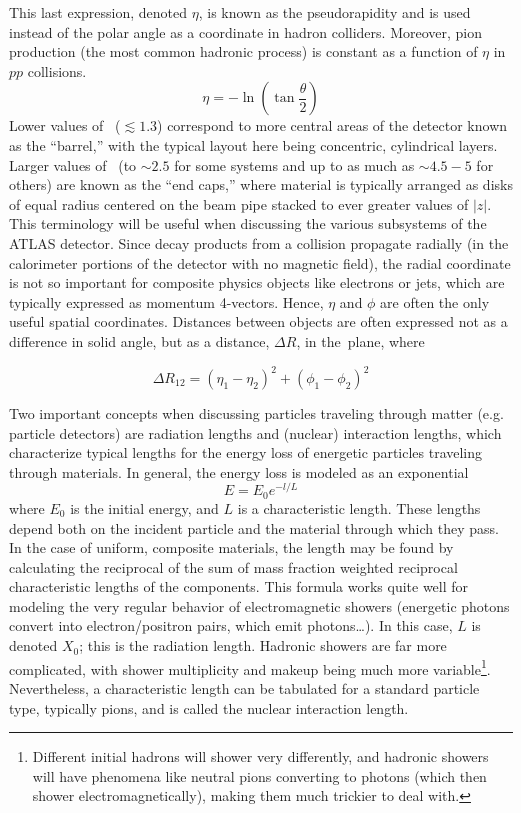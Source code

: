 This last expression, denoted $\eta$, is known as the pseudorapidity and is used instead of the polar angle as a coordinate in hadron colliders.  Moreover, pion production (the most common hadronic process) is constant as a function of $\eta$ in $pp$ collisions.
\begin{equation}
\eta=-\ln\left(\tan\frac{\theta}{2}\right)
\end{equation}
Lower values of \aeta\, ($\lesssim 1.3$) correspond to more central areas of the detector known as the ``barrel,'' with the typical layout here being concentric, cylindrical layers.  Larger values of \aeta\, (to $\sim2.5$ for some systems and up to as much as $\sim 4.5-5$ for others) are known as the ``end caps,'' where material is typically arranged as disks of equal radius centered on the beam pipe stacked to ever greater values of $\left|z\right|$.  This terminology will be useful when discussing the various subsystems of the ATLAS detector.  Since decay products from a collision propagate radially (in the calorimeter portions of the detector with no magnetic field), the radial coordinate is not so important for composite physics objects like electrons or jets, which are typically expressed as momentum 4-vectors.  Hence, $\eta$ and $\phi$ are often the only useful spatial coordinates.  Distances between objects are often expressed not as a difference in solid angle, but as a distance, $\Delta R$, in the \ephi\,plane, where

\begin{equation}
\Delta R_{12} = \left(\eta_1-\eta_2\right)^2+\left(\phi_1-\phi_2\right)^2
\end{equation}

Two important concepts when discussing particles traveling through matter (e.g. particle detectors) are radiation lengths and (nuclear) interaction lengths,  which characterize typical lengths for the energy loss of energetic particles traveling through materials.  In general, the energy loss is modeled as an exponential
\begin{equation}
E=E_0e^{-l/L}
\end{equation}
where $E_0$ is the initial energy, and $L$ is a characteristic length.  These lengths depend both on the incident particle and the material through which they pass.  In the case of uniform, composite materials, the length may be found by calculating the reciprocal of the sum of mass fraction weighted reciprocal characteristic lengths of the components.  This formula works quite well for modeling the very regular behavior of electromagnetic showers (energetic photons convert into electron/positron pairs, which emit photons\ldots).  In this case, $L$ is denoted $X_0$; this is the radiation length.  Hadronic showers are far more complicated, with shower multiplicity and makeup being much more variable\footnote{Different initial hadrons will shower very differently, and hadronic showers will have phenomena like neutral pions converting to photons (which then shower electromagnetically), making them much trickier to deal with.}.  Nevertheless, a characteristic length can be tabulated for a standard particle type, typically pions, and is called the nuclear interaction length.

